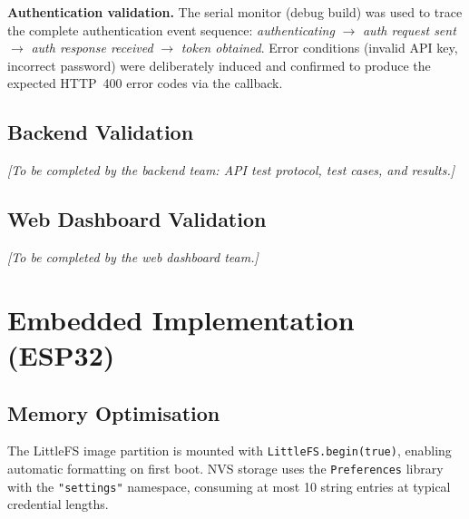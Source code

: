 \textbf{Authentication validation.}
The serial monitor (debug build) was used to trace the complete authentication event
sequence: \textit{authenticating} $\to$ \textit{auth request sent} $\to$
\textit{auth response received} $\to$ \textit{token obtained}.
Error conditions (invalid API key, incorrect password) were deliberately induced
and confirmed to produce the expected HTTP~400 error codes via the callback.

\subsection{Backend Validation}
\begin{center}
	\textit{[To be completed by the backend team: API test protocol, test cases,
				and results.]}
\end{center}

\subsection{Web Dashboard Validation}
\begin{center}
	\textit{[To be completed by the web dashboard team.]}
\end{center}

\section{Embedded Implementation (ESP32)}

\subsection{Memory Optimisation}

The LittleFS image partition is mounted with \texttt{LittleFS.begin(true)}, enabling automatic
formatting on first boot.
NVS storage uses the \texttt{Preferences} library with the \texttt{"settings"}
namespace, consuming at most 10 string entries at typical credential lengths.

